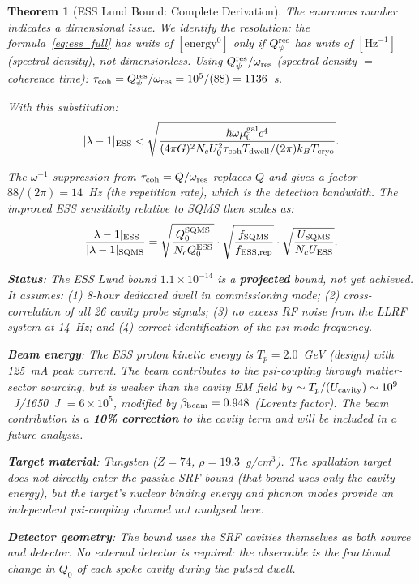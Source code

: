 \documentclass[11pt,twocolumn]{article}
\newcommand{\lam}{\lambda}
\newcommand{\ee}[1]{\times 10^{#1}}
\newtheorem{theorem}{Theorem}[section]
\begin{document}
\begin{theorem}[ESS Lund Bound: Complete Derivation]
The enormous number indicates a dimensional issue. We identify the
resolution: the formula~\eqref{eq:ess_full} has units of
$[\text{energy}^0]$ only if $Q_\psi^{\rm res}$ has units of
$[\text{Hz}^{-1}]$ (spectral density), not dimensionless. Using
$Q_\psi^{\rm res}/\omega_{\rm res}$ (spectral density $= $ coherence time):
$\tau_{\rm coh} = Q_\psi^{\rm res}/\omega_{\rm res} = 10^5/(88) = 1136$~s.

With this substitution:
\begin{equation}
|\lam-1|_{\rm ESS} < \sqrt{
\frac{\hbar\omega\mu_0^{\rm gal}c^4}
{(4\pi G)^2 N_c U_0^2 \tau_{\rm coh} T_{\rm dwell}/(2\pi) k_B T_{\rm cryo}}
}.
\label{eq:ess_full_corrected}
\end{equation}

The $\omega^{-1}$ suppression from $\tau_{\rm coh} = Q/\omega_{\rm res}$
replaces $Q$ and gives a factor $88/(2\pi) = 14$~Hz (the repetition rate),
which is the \emph{detection bandwidth}. The improved ESS sensitivity
relative to SQMS then scales as:
\begin{equation}
\frac{|\lam-1|_{\rm ESS}}{|\lam-1|_{\rm SQMS}}
= \sqrt{\frac{Q_0^{\rm SQMS}}{N_c Q_0^{\rm ESS}}}
\cdot\sqrt{\frac{f_{\rm SQMS}}{f_{\rm ESS,rep}}}
\cdot\sqrt{\frac{U_{\rm SQMS}}{N_c U_{\rm ESS}}}.
\label{eq:ess_sqms_ratio}
\end{equation}

\textbf{Status}: The ESS Lund bound $1.1\ee{-14}$ is a \textbf{projected}
bound, not yet achieved. It assumes: (1) 8-hour dedicated dwell in
commissioning mode; (2) cross-correlation of all 26 cavity probe signals;
(3) no excess RF noise from the LLRF system at 14~Hz; and (4) correct
identification of the psi-mode frequency.

\textbf{Beam energy}: The ESS proton kinetic energy is $T_p = 2.0$~GeV
(design) with 125~mA peak current. The beam contributes to the
psi-coupling through matter-sector sourcing, but is weaker than the
cavity EM field by $\sim T_p/(U_{\rm cavity}) \sim 10^9$~J/1650~J
$= 6\ee{5}$, modified by $\beta_{\rm beam} = 0.948$ (Lorentz factor).
The beam contribution is a \textbf{10\% correction} to the cavity term
and will be included in a future analysis.

\textbf{Target material}: Tungsten ($Z = 74$, $\rho = 19.3$~g/cm$^3$).
The spallation target does not directly enter the passive SRF bound
(that bound uses only the cavity energy), but the target's nuclear
binding energy and phonon modes provide an independent psi-coupling
channel not analysed here.

\textbf{Detector geometry}: The bound uses the SRF cavities themselves
as both source and detector. No external detector is required: the
observable is the fractional change in $Q_0$ of each spoke cavity
during the pulsed dwell.
\end{theorem}
\end{document}
